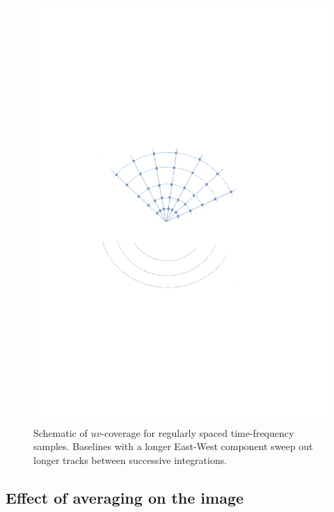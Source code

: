 \documentclass[useAMS,usenatbib]{mn2e}
\begin{document}
\begin{figure}
\includegraphics[width=1\columnwidth]{./Figures/uvcovmodify.pdf}\caption{Schematic of $uv$-coverage for 
regularly spaced time-frequency samples. Baselines with a longer East-West component sweep out longer tracks between successive 
integrations.}\label{fig:uvcov}
\end{figure}


\subsection{Effect of averaging on the image}
\label{sec:effectbw}
\end{document}
